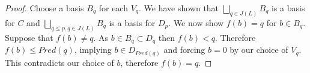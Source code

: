 \begin{proof}
Choose a basis $B_q$ for each $V_q$.  We have shown that $\bigsqcup_{q\in J(L)} B_q$ is a basis for $C$ and $\bigsqcup_{q\leq p, q\in J(L)} B_q$ is a basis for $D_p$.   We now show $f(b)=q$ for $b\in B_q$. Suppose that $f(b)\neq q$.  As $b\in B_q\subset D_q$ then $f(b)< q$.  Therefore $f(b)\leq Pred(q)$, implying $b\in D_{Pred(q)}$ and forcing $b=0$ by our choice of $V_q$.  This contradicts our choice of $b$, therefore $f(b)=q$. %

%
%
%
%
%
%
%
%
%
%
%
%
%

\end{proof}





